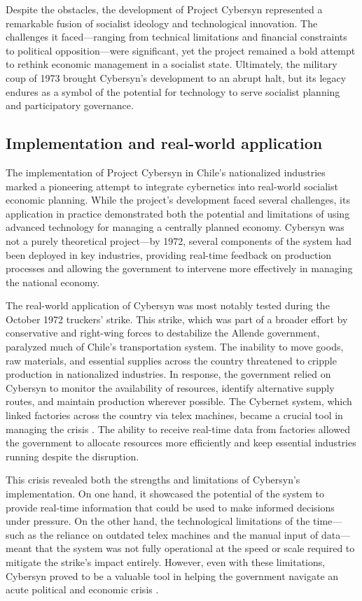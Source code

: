 \begin{refsection}
Despite the obstacles, the development of Project Cybersyn represented a remarkable fusion of socialist ideology and technological innovation. The challenges it faced—ranging from technical limitations and financial constraints to political opposition—were significant, yet the project remained a bold attempt to rethink economic management in a socialist state. Ultimately, the military coup of 1973 brought Cybersyn’s development to an abrupt halt, but its legacy endures as a symbol of the potential for technology to serve socialist planning and participatory governance.

\subsection{Implementation and real-world application}

The implementation of Project Cybersyn in Chile’s nationalized industries marked a pioneering attempt to integrate cybernetics into real-world socialist economic planning. While the project’s development faced several challenges, its application in practice demonstrated both the potential and limitations of using advanced technology for managing a centrally planned economy. Cybersyn was not a purely theoretical project—by 1972, several components of the system had been deployed in key industries, providing real-time feedback on production processes and allowing the government to intervene more effectively in managing the national economy.

The real-world application of Cybersyn was most notably tested during the October 1972 truckers’ strike. This strike, which was part of a broader effort by conservative and right-wing forces to destabilize the Allende government, paralyzed much of Chile’s transportation system. The inability to move goods, raw materials, and essential supplies across the country threatened to cripple production in nationalized industries. In response, the government relied on Cybersyn to monitor the availability of resources, identify alternative supply routes, and maintain production wherever possible. The Cybernet system, which linked factories across the country via telex machines, became a crucial tool in managing the crisis \cite[pp.~123-127]{medina2014}. The ability to receive real-time data from factories allowed the government to allocate resources more efficiently and keep essential industries running despite the disruption.

This crisis revealed both the strengths and limitations of Cybersyn's implementation. On one hand, it showcased the potential of the system to provide real-time information that could be used to make informed decisions under pressure. On the other hand, the technological limitations of the time—such as the reliance on outdated telex machines and the manual input of data—meant that the system was not fully operational at the speed or scale required to mitigate the strike's impact entirely. However, even with these limitations, Cybersyn proved to be a valuable tool in helping the government navigate an acute political and economic crisis \cite[pp.~149-152]{beer1994}.


\end{refsection}
